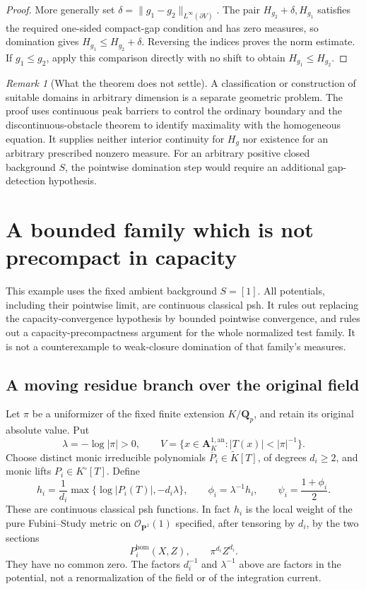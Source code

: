 \documentclass[11pt,a4paper]{article}
\numberwithin{equation}{section}
\theoremstyle{definition}
\theoremstyle{remark}
\newtheorem{remark}[theorem]{Remark}
\newcommand{\an}{\mathrm{an}}
\begin{document}
\begin{proof}
More generally set
$\delta=\|g_1-g_2\|_{L^\infty(\partial V)}$.
The pair $H_{g_2}+\delta,H_{g_1}$ satisfies the required
one-sided compact-gap condition and has zero measures, so domination
gives $H_{g_1}\leq H_{g_2}+\delta$. Reversing the indices
proves the norm estimate. If $g_1\leq g_2$, apply this
comparison directly with no shift to obtain
$H_{g_1}\leq H_{g_2}$.
\end{proof}

\begin{remark}[What the theorem does not settle]
A classification or construction of suitable domains in
arbitrary dimension is a separate geometric problem.
The proof uses continuous peak barriers to control the
ordinary boundary and the discontinuous-obstacle theorem
to identify maximality with the homogeneous equation.
It supplies neither interior continuity for $H_g$ nor
existence for an arbitrary prescribed nonzero measure.
For an arbitrary positive closed background $S$, the
pointwise domination step would require an additional
gap-detection hypothesis.
\end{remark}




\section{A bounded family which is not precompact in capacity}
\label{sec:r2-capacity-noncompactness}

This example uses the fixed ambient background $S=[1]$. All
potentials, including their pointwise limit, are continuous
classical psh. It rules out replacing the capacity-convergence
hypothesis by bounded pointwise convergence, and rules out a
capacity-precompactness argument for the whole normalized test
family. It is not a counterexample to weak-closure domination
of that family's measures.

\subsection{A moving residue branch over the original field}

Let $\pi$ be a uniformizer of the fixed finite extension
$K/\mathbf Q_p$, and retain its original absolute value. Put
\[
 \lambda=-\log|\pi|>0,\qquad
 V=\{x\in\mathbf A_K^{1,\an}:|T(x)|<|\pi|^{-1}\}.
\]
Choose distinct monic irreducible polynomials
$\overline P_i\in\widetilde K[T]$, of degrees $d_i\geq2$,
and monic lifts $P_i\in K^\circ[T]$. Define
\[
 h_i=\frac1{d_i}\max\{\log|P_i(T)|,-d_i\lambda\},
 \qquad
 \phi_i=\lambda^{-1}h_i,\qquad
 \psi_i=\frac{1+\phi_i}{2}.
\]
These are continuous classical psh functions. In fact $h_i$ is
the local weight of the pure Fubini--Study metric on
$\mathcal O_{\mathbf P^1}(1)$ specified, after tensoring by
$d_i$, by the two sections
\[
 P_i^{\mathrm{hom}}(X,Z),\qquad \pi^{d_i}Z^{d_i}.
\]
They have no common zero. The factors $d_i^{-1}$ and
$\lambda^{-1}$ above are factors in the potential, not a
renormalization of the field or of the integration current.
\end{document}
